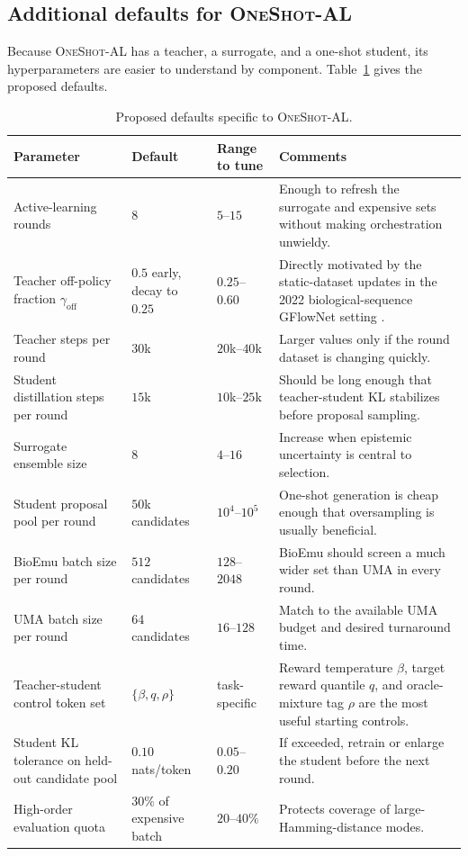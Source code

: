 \documentclass[11pt]{article}
\newcommand{\methodIII}{\textsc{OneShot-AL}}
\begin{document}
\subsection{Additional defaults for \methodIII{}}

Because \methodIII{} has a teacher, a surrogate, and a one-shot student, its hyperparameters are easier to understand by component. Table~\ref{tab:method3hyper} gives the proposed defaults.

\begin{table}[H]
\centering
\caption{Proposed defaults specific to \methodIII{}.}
\label{tab:method3hyper}
\begin{tabularx}{\textwidth}{>{\raggedright\arraybackslash}p{} >{\centering\arraybackslash}p{} >{\centering\arraybackslash}p{} X}
\toprule
Parameter & Default & Range to tune & Comments \\
\midrule
Active-learning rounds & $8$ & $5$--$15$ & Enough to refresh the surrogate and expensive sets without making orchestration unwieldy. \\
Teacher off-policy fraction $\gamma_{\mathrm{off}}$ & $0.5$ early, decay to $0.25$ & $0.25$--$0.60$ & Directly motivated by the static-dataset updates in the 2022 biological-sequence GFlowNet setting \citep{jain2022bioseqgfn}. \\
Teacher steps per round & $30$k & $20$k--$40$k & Larger values only if the round dataset is changing quickly. \\
Student distillation steps per round & $15$k & $10$k--$25$k & Should be long enough that teacher-student KL stabilizes before proposal sampling. \\
Surrogate ensemble size & $8$ & $4$--$16$ & Increase when epistemic uncertainty is central to selection. \\
Student proposal pool per round & $50$k candidates & $10^4$--$10^5$ & One-shot generation is cheap enough that oversampling is usually beneficial. \\
BioEmu batch size per round & $512$ candidates & $128$--$2048$ & BioEmu should screen a much wider set than UMA in every round. \\
UMA batch size per round & $64$ candidates & $16$--$128$ & Match to the available UMA budget and desired turnaround time. \\
Teacher-student control token set & $\{\beta, q, \rho\}$ & task-specific & Reward temperature $\beta$, target reward quantile $q$, and oracle-mixture tag $\rho$ are the most useful starting controls. \\
Student KL tolerance on held-out candidate pool & $0.10$ nats/token & $0.05$--$0.20$ & If exceeded, retrain or enlarge the student before the next round. \\
High-order evaluation quota & $30\%$ of expensive batch & $20$--$40\%$ & Protects coverage of large-Hamming-distance modes. \\
\bottomrule
\end{tabularx}
\end{table}
\end{document}
